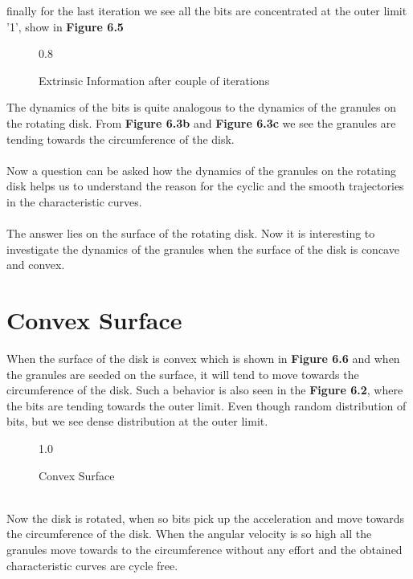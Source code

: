 finally for the last iteration we see all the bits are concentrated at the outer limit '1', show in \textbf{Figure 6.5}\begin{figure}[htb]
\centerline{  {0.8} }
\caption{Extrinsic Information after couple of iterations}
\end{figure}
\newpage
The dynamics of the bits is quite analogous to the dynamics of the granules on the rotating disk. From \textbf{Figure 6.3b} and \textbf{Figure 6.3c} we see the granules are tending towards the circumference of the disk. \\ \\
Now a question can be asked how the dynamics of the granules on the rotating disk helps us to understand the reason for the cyclic and the smooth trajectories in the characteristic curves.\\ \\
The answer lies on the surface of the rotating disk. Now it is interesting to investigate the dynamics of the granules when the surface of the disk is concave and convex.
\section{Convex Surface}
When the surface of the disk is convex which is shown in \textbf{Figure 6.6} and when the granules are seeded on the surface, it will tend to move towards the circumference of the disk. Such a behavior is also seen in the \textbf{Figure 6.2}, where the bits are tending towards the outer limit. Even though random distribution of bits, but we see dense distribution at the outer limit. 
\begin{figure}[htb]
\centerline{  {1.0} }
\caption{Convex Surface}
\end{figure}\\
Now the disk is rotated, when so bits pick up the acceleration and move towards the circumference of the disk. When the angular velocity is so high all the granules move towards to the circumference without any effort and the obtained characteristic curves are cycle free.
